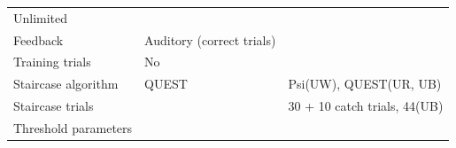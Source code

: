 \documentclass[]{article}
\begin{document}
\begin{longtable}[]{@{}lll@{}}
\begin{minipage}[t]{0.29\columnwidth}
Unlimited\strut
\end{minipage} & \begin{minipage}[t]{0.26\columnwidth}\raggedright
\strut
\end{minipage}\tabularnewline
\begin{minipage}[t]{0.36\columnwidth}\raggedright
Feedback\strut
\end{minipage} & \begin{minipage}[t]{0.29\columnwidth}\raggedright
Auditory (correct trials)\strut
\end{minipage} & \begin{minipage}[t]{0.26\columnwidth}\raggedright
\strut
\end{minipage}\tabularnewline
\begin{minipage}[t]{0.36\columnwidth}\raggedright
Training trials\strut
\end{minipage} & \begin{minipage}[t]{0.29\columnwidth}\raggedright
No\strut
\end{minipage} & \begin{minipage}[t]{0.26\columnwidth}\raggedright
\strut
\end{minipage}\tabularnewline
\begin{minipage}[t]{0.36\columnwidth}\raggedright
Staircase algorithm\strut
\end{minipage} & \begin{minipage}[t]{0.29\columnwidth}\raggedright
QUEST\strut
\end{minipage} & \begin{minipage}[t]{0.26\columnwidth}\raggedright
Psi(UW), QUEST(UR, UB)\strut
\end{minipage}\tabularnewline
\begin{minipage}[t]{0.36\columnwidth}\raggedright
Staircase trials\strut
\end{minipage} & \begin{minipage}[t]{0.29\columnwidth}\raggedright
\strut
\end{minipage} & \begin{minipage}[t]{0.26\columnwidth}\raggedright
30 + 10 catch trials, 44(UB)\strut
\end{minipage}\tabularnewline
\begin{minipage}[t]{0.36\columnwidth}\raggedright
Threshold parameters\strut
\end{minipage} & \begin{minipage}[t]{0.29\columnwidth}\raggedright
\strut
\end{minipage} & \begin{minipage}[t]{0.26\columnwidth}\raggedright

\end{minipage}
\end{longtable}
\end{document}
